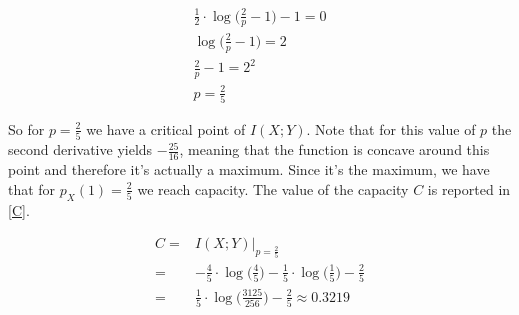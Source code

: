 \begin{equation}
\begin{gathered}
	\frac{1}{2} \cdot \log \Big ( \frac{2}{p} - 1\Big)-1 = 0 \\
	\log \Big ( \frac{2}{p} - 1\Big) = 2 \\
	\frac{2}{p} - 1 = 2^2 \\
	p = \frac{2}{5}
\end{gathered}
\end{equation}

So for $p=\frac{2}{5}$ we have a critical point of $I(X;Y)$. Note that for this value of $p$ the second derivative yields $-\frac{25}{16}$, meaning that the function is concave around this point and therefore it's actually a maximum. Since it's the maximum, we have that for $p_X(1)=\frac{2}{5}$ we reach capacity. The value of the capacity $C$ is reported in \eqref{C}.

\begin{equation}
\begin{aligned}
	C = & I(X;Y)|_{p=\frac{2}{5}} \\ = &-\frac{4}{5} \cdot \log\Big (\frac{4}{5}\Big)- \frac{1}{5}\cdot\log \Big(\frac{1}{5}\Big)-\frac{2}{5} \\
	= & \frac{1}{5} \cdot \log \Big (\frac{3125}{256} \Big)-\frac{2}{5} \approx 0.3219
	\label{C}
\end{aligned}
\end{equation}
